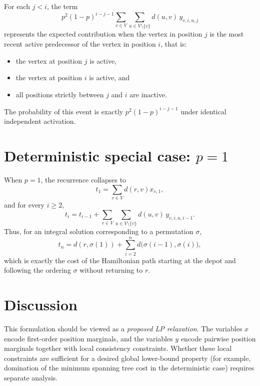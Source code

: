 \documentclass[11pt]{article}
\begin{document}
For each $j < i$, the term
\[
p^2(1-p)^{i-j-1}
\sum_{v \in V}\sum_{u \in V \setminus \{v\}} d(u,v)\, y_{v,i,u,j}
\]
represents the expected contribution when the vertex in position $j$ is the most recent active predecessor of the vertex in position $i$, that is:
\begin{itemize}[leftmargin=1.5em]
    \item the vertex at position $j$ is active,
    \item the vertex at position $i$ is active, and
    \item all positions strictly between $j$ and $i$ are inactive.
\end{itemize}
The probability of this event is exactly $p^2(1-p)^{i-j-1}$ under identical independent activation.

\section*{Deterministic special case: $p=1$}
When $p=1$, the recurrence collapses to
\[
t_1 = \sum_{v \in V} d(r,v)x_{v,1},
\]
and for every $i \ge 2$,
\[
t_i = t_{i-1} + \sum_{v \in V}\sum_{u \in V \setminus \{v\}} d(u,v)\, y_{v,i,u,i-1}.
\]
Thus, for an integral solution corresponding to a permutation $\sigma$,
\[
t_n = d(r,\sigma(1)) + \sum_{i=2}^n d\bigl(\sigma(i-1),\sigma(i)\bigr),
\]
which is exactly the cost of the Hamiltonian path starting at the depot and following the ordering $\sigma$ without returning to $r$.

\section*{Discussion}
This formulation should be viewed as a \emph{proposed LP relaxation}. The variables $x$ encode first-order position marginals, and the variables $y$ encode pairwise position marginals together with local consistency constraints. Whether these local constraints are sufficient for a desired global lower-bound property (for example, domination of the minimum spanning tree cost in the deterministic case) requires separate analysis.
\end{document}
